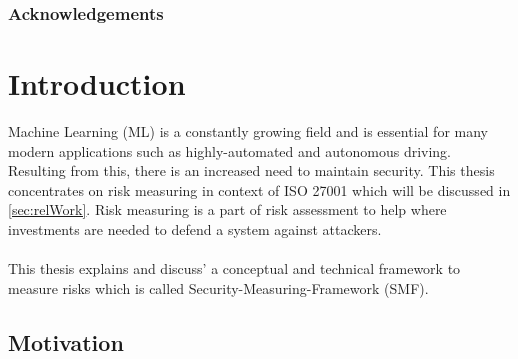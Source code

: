 \begin{abstract}

\end{abstract}

\subsubsection*{Acknowledgements}

\newpage

\section{Introduction}
\label{sec:intro}

Machine Learning (ML) is a constantly growing field and is essential for many modern applications such as highly-automated and autonomous driving. Resulting from this, there is an increased need to maintain security. This thesis concentrates on risk measuring in context of ISO 27001 which will be discussed in \ref{sec:relWork}. Risk measuring is a part of risk assessment to help where investments are needed to defend a system against attackers. \\ \\
This thesis explains and discuss' a conceptual and technical framework to measure risks which is called Security-Measuring-Framework (SMF).

\subsection{Motivation}
